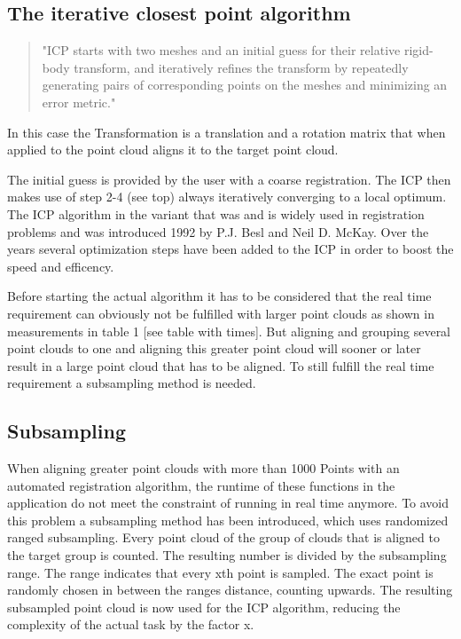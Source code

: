 \documentclass[hyperref,english,bachelorofscience,bibnum]{cgvpub}
\begin{document}
\subsection{The iterative closest point algorithm}

\begin{quote}
"ICP starts with two meshes and an initial guess for their relative rigid-body transform, and iteratively refines the transform by repeatedly generating pairs of corresponding points on the meshes and minimizing an error metric."\cite{Rusinkiewicza}
\end{quote}
In this case the Transformation is a translation and a rotation matrix that when applied to the point cloud aligns it to the target point cloud.

The initial guess is provided by the user with a coarse registration. The ICP then makes use of step 2-4 (see top) always iteratively converging to a local optimum.\cite{Besl92}
The ICP algorithm in the variant that was and is widely used in registration problems and was introduced 1992 by P.J. Besl and Neil D. McKay\cite{Besl92}. Over the years several optimization steps have been added to the ICP in order to boost the speed and efficency.

Before starting the actual algorithm it has to be considered that the real time requirement can obviously not be fulfilled with larger point clouds as shown in measurements in table 1 [see table with times]. But aligning and grouping several point clouds to one and aligning this greater point cloud will sooner or later result in a large point cloud that has to be aligned. To still fulfill the real time requirement a subsampling method is needed.

\subsection{Subsampling}

When aligning greater point clouds with more than 1000 Points with an automated registration algorithm, the runtime of these functions in the application do not meet the constraint of running in real time anymore. 
To avoid this problem a subsampling method has been introduced, which uses randomized ranged subsampling. Every point cloud of the group of clouds that is aligned to the target group is counted. The resulting number is divided by the subsampling range. The range indicates that every xth point is sampled. The exact point is randomly chosen in between the ranges distance, counting upwards. The resulting subsampled point cloud is now used for the ICP algorithm, reducing the complexity of the actual task by the factor x.
\end{document}
